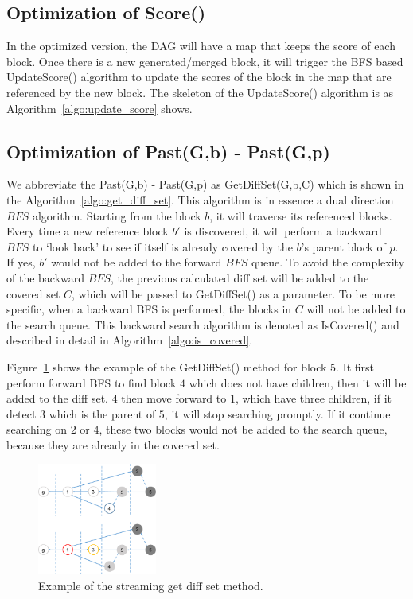 \subsection{Optimization of Score()}
In the optimized version, the DAG will have a map that keeps the score of each block. Once there is a new generated/merged block,
it will trigger the BFS based UpdateScore() algorithm to update the scores of the block in the map that are referenced by the new block.
The skeleton of the UpdateScore() algorithm is as Algorithm~\ref{algo:update_score} shows.



\subsection{Optimization of Past(G,b) - Past(G,p)}

We abbreviate the Past(G,b) - Past(G,p) as GetDiffSet(G,b,C) which is shown in the Algorithm~\ref{algo:get_diff_set}.
This algorithm is in essence a dual direction $BFS$ algorithm. Starting from the block $b$, it will traverse its referenced blocks.
Every time a new reference block $b'$ is discovered, it will perform a backward $BFS$ to `look back' to see if itself is already covered by the $b$'s parent block of $p$. 
If yes, $b'$ would not be added to the forward $BFS$ queue.  
To avoid the complexity of the backward $BFS$, the previous calculated diff set will be added to the covered set $C$, which will be passed to GetDiffSet() as a parameter.
To be more specific, when a backward BFS is performed, the blocks in $C$ will not be added to the search queue.
This backward search algorithm is denoted as IsCovered() and described in detail in Algorithm~\ref{algo:is_covered}.

Figure~\ref{get_diff} shows the example of the GetDiffSet() method for block $5$.
It first perform forward BFS to find block $4$ which does not have children, then it will be added to the diff set.
$4$ then move forward to $1$, which have three children, if it detect $3$ which is the parent of $5$, it will stop searching promptly.
If it continue searching on $2$ or $4$, these two blocks would not be added to the search queue, because they are already in the covered set.





\begin{figure}[!ht]
\begin{center}
\includegraphics[width=0.35\textwidth]{figures/get_diff.pdf}
    \caption{
        Example of the streaming get diff set method.
     }
\label{get_diff}
\end{center}
\end{figure}


